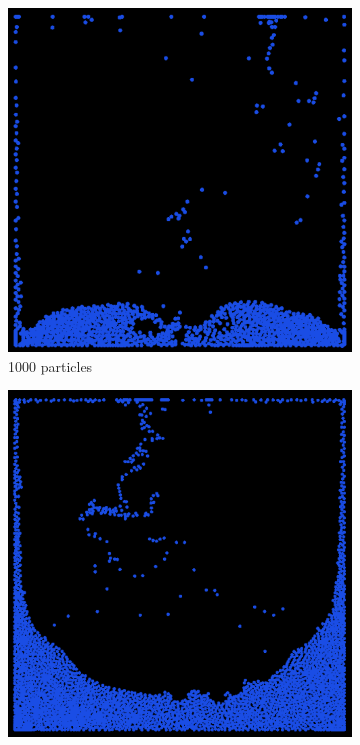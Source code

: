 \begin{figure}[h]
\begin{subfigure}[b]{0.2\textwidth}
        \includegraphics[width=\textwidth]{figures/apic1000.png}
        \caption{1000 particles}
    \end{subfigure}
    \hspace{1em}
    \begin{subfigure}[b]{0.2\textwidth}
        \includegraphics[width=\textwidth]{figures/apic4000.png}

\end{subfigure}
\end{figure}
